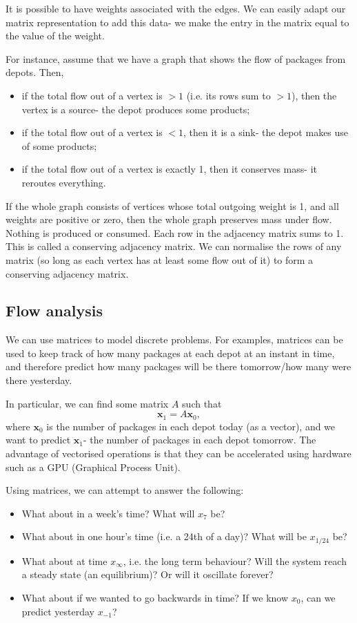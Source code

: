 \documentclass[a4paper, openany]{memoir}
\begin{document}
    It is possible to have weights associated with the edges. We can easily adapt our matrix representation to add this data- we make the entry in the matrix equal to the value of the weight.

    For instance, assume that we have a graph that shows the flow of packages from depots. Then,
    \begin{itemize}
        \item if the total flow out of a vertex is $> 1$ (i.e. its rows sum to $> 1$), then the vertex is a source- the depot produces some products;
        \item if the total flow out of a vertex is $< 1$, then it is a sink- the depot makes use of some products;
        \item if the total flow out of a vertex is exactly 1, then it conserves mass- it reroutes everything.
    \end{itemize}
    If the whole graph consists of vertices whose total outgoing weight is 1, and all weights are positive or zero, then the whole graph preserves mass under flow. Nothing is produced or consumed. Each row in the adjacency matrix sums to 1. This is called a conserving adjacency matrix. We can normalise the rows of any matrix (so long as each vertex has at least some flow out of it) to form a conserving adjacency matrix.

    \subsection{Flow analysis}
    We can use matrices to model discrete problems. For examples, matrices can be used to keep track of how many packages at each depot at an instant in time, and therefore predict how many packages will be there tomorrow/how many were there yesterday.

    In particular, we can find some matrix $A$ such that
    \[\mathbf{x}_1 = A \mathbf{x}_0,\]
    where $\mathbf{x}_0$ is the number of packages in each depot today (as a vector), and we want to predict $\mathbf{x}_1$- the number of packages in each depot tomorrow. The advantage of vectorised operations is that they can be accelerated using hardware such as a GPU (Graphical Process Unit).

    Using matrices, we can attempt to answer the following:
    \begin{itemize}
        \item What about in a week's time? What will $x_7$ be?
        \item What about in one hour's time (i.e. a 24th of a day)? What will be $x_{1/24}$ be?
        \item What about at time $x_{\infty}$, i.e. the long term behaviour? Will the system reach a steady state (an equilibrium)? Or will it oscillate forever?
        \item What about if we wanted to go backwards in time? If we know $x_0$, can we predict yesterday $x_{-1}$?
    \end{itemize}
    \newpage
\end{document}
